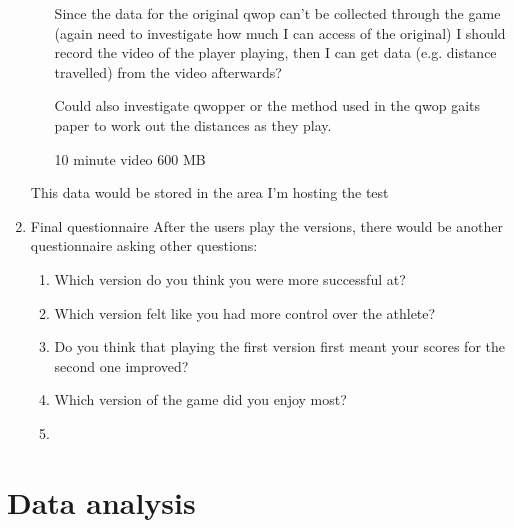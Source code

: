 \documentclass[12pt,a4paper,twoside]{article}
\begin{document}
\begin{enumerate}
\begin{enumerate}
		Since the data for the original qwop can't be collected through the game (again need to investigate how much I can access of the original) I should record the video of the player playing, then I can get data (e.g. distance travelled) from the video afterwards?

		Could also investigate qwopper or the method used in the qwop gaits paper to work out the distances as they play.

		10 minute video 600 MB
	\end{enumerate}

	This data would be stored in the area I'm hosting the test

	\item Final questionnaire
	After the users play the versions, there would be another questionnaire asking other questions:

	\begin{enumerate}
		\item Which version do you think you were more successful at?
		\item Which version felt like you had more control over the athlete?
		\item Do you think that playing the first version first meant your scores for the second one improved?
		\item Which version of the game did you enjoy most?
		\item 
	\end{enumerate}



\end{enumerate}


\section*{Data analysis}
\end{document}
